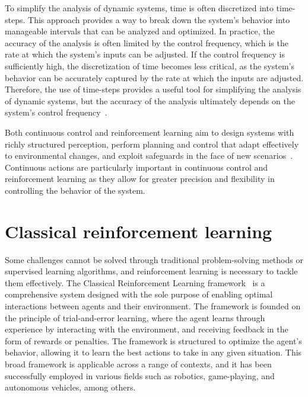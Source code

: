 To simplify the analysis of dynamic systems, time is often discretized into time-steps. This approach provides a way to break down the system's behavior into manageable intervals that can be analyzed and optimized. In practice, the accuracy of the analysis is often limited by the control frequency, which is the rate at which the system's inputs can be adjusted. If the control frequency is sufficiently high, the discretization of time becomes less critical, as the system's behavior can be accurately captured by the rate at which the inputs are adjusted. Therefore, the use of time-steps provides a useful tool for simplifying the analysis of dynamic systems, but the accuracy of the analysis ultimately depends on the system's control frequency~\cite{franklin_feedback_2002}.

Both continuous control and reinforcement learning aim to design systems with richly structured perception, perform planning and control that adapt effectively to environmental changes, and exploit safeguards in the face of new scenarios~\cite{recht_tour_2019}. Continuous actions are particularly important in continuous control and reinforcement learning as they allow for greater precision and flexibility in controlling the behavior of the system.

\section{Classical reinforcement learning}

Some challenges cannot be solved through traditional problem-solving methods or supervised learning algorithms, and reinforcement learning is necessary to tackle them effectively. 
The Classical Reinforcement Learning framework~\cite{sutton_reinforcement_1998} is a comprehensive system designed with the sole purpose of enabling optimal interactions between agents and their environment. The framework is founded on the principle of trial-and-error learning, where the agent learns through experience by interacting with the environment, and receiving feedback in the form of rewards or penalties. The framework is structured to optimize the agent's behavior, allowing it to learn the best actions to take in any given situation. This broad framework is applicable across a range of contexts, and it has been successfully employed in various fields such as robotics, game-playing, and autonomous vehicles, among others.

